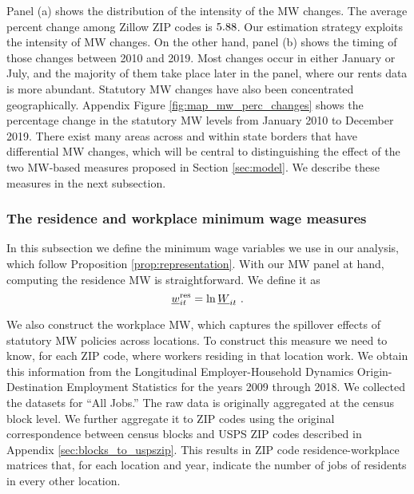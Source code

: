 Panel (a) shows the distribution of the intensity of the MW changes. 
The average percent change among Zillow ZIP codes is $\textnormal{5.88}$.
Our estimation strategy exploits the intensity of MW changes.
On the other hand, panel (b) shows the timing of those changes between 2010 and 
2019.
Most changes occur in either January or July, and the majority of them take 
place later in the panel, where our rents data is more abundant.
Statutory MW changes have also been concentrated geographically.
Appendix Figure \ref{fig:map_mw_perc_changes} shows the percentage change 
in the statutory MW levels from January 2010 to December 2019.
There exist many areas across and within state borders that have differential 
MW changes,
which will be central to distinguishing the effect of the two MW-based measures
proposed in Section \ref{sec:model}.
We describe these measures in the next subsection. 

\subsubsection{The residence and workplace minimum wage measures}

In this subsection we define the minimum wage variables we use in our analysis,
which follow Proposition \ref{prop:representation}.
With our MW panel at hand, computing the residence MW is straightforward.
We define it as
\begin{equation*}
    \underline{w}^{\text{res}}_{it} = \ln \underline{W}_{it} \ .
\end{equation*}

We also construct the workplace MW, which captures the spillover effects of
statutory MW policies across locations.
To construct this measure we need to know, for each ZIP code, where workers 
residing in that location work.
We obtain this information from the Longitudinal Employer-Household 
Dynamics Origin-Destination Employment Statistics \parencite[LODES;][]{CensusLODES}
for the years 2009 through 2018.
We collected the datasets for ``All Jobs.''
The raw data is originally aggregated at the census block level. 
We further aggregate it to ZIP codes using the original correspondence between 
census blocks and USPS ZIP codes described in Appendix 
\ref{sec:blocks_to_uspszip}.
This results in ZIP code residence-workplace matrices that, for each location 
and year, indicate the number of jobs of residents in every other location.

